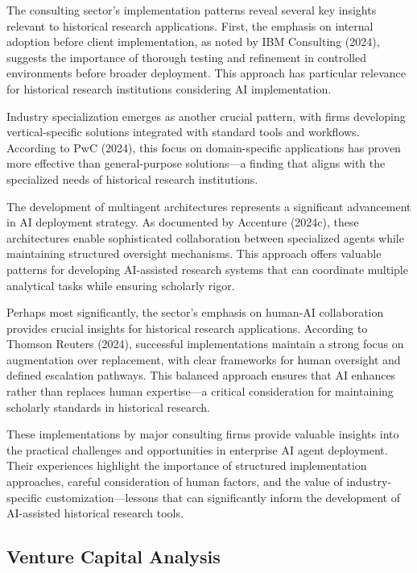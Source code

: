 \documentclass[
]{article}
\begin{document}
The consulting sector's implementation patterns reveal several key
insights relevant to historical research applications. First, the
emphasis on internal adoption before client implementation, as noted by
IBM Consulting (2024), suggests the importance of thorough testing and
refinement in controlled environments before broader deployment. This
approach has particular relevance for historical research institutions
considering AI implementation.

Industry specialization emerges as another crucial pattern, with firms
developing vertical-specific solutions integrated with standard tools
and workflows. According to PwC (2024), this focus on domain-specific
applications has proven more effective than general-purpose
solutions---a finding that aligns with the specialized needs of
historical research institutions.

The development of multiagent architectures represents a significant
advancement in AI deployment strategy. As documented by Accenture
(2024c), these architectures enable sophisticated collaboration between
specialized agents while maintaining structured oversight mechanisms.
This approach offers valuable patterns for developing AI-assisted
research systems that can coordinate multiple analytical tasks while
ensuring scholarly rigor.

Perhaps most significantly, the sector's emphasis on human-AI
collaboration provides crucial insights for historical research
applications. According to Thomson Reuters (2024), successful
implementations maintain a strong focus on augmentation over
replacement, with clear frameworks for human oversight and defined
escalation pathways. This balanced approach ensures that AI enhances
rather than replaces human expertise---a critical consideration for
maintaining scholarly standards in historical research.

These implementations by major consulting firms provide valuable
insights into the practical challenges and opportunities in enterprise
AI agent deployment. Their experiences highlight the importance of
structured implementation approaches, careful consideration of human
factors, and the value of industry-specific customization---lessons that
can significantly inform the development of AI-assisted historical
research tools.

\subsection{Venture Capital Analysis}\label{venture-capital-analysis}
\end{document}
